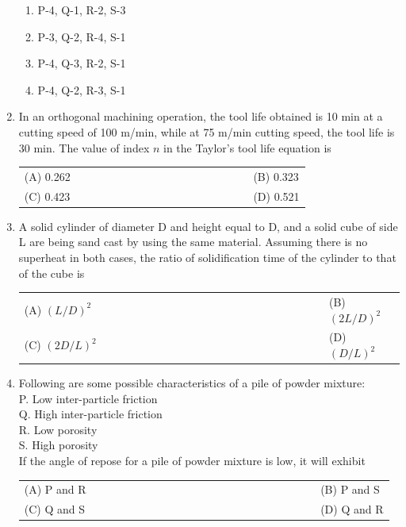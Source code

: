 \documentclass[a4paper,12pt]{article}
\begin{document}
\begin{enumerate}[label=Q.\arabic*, leftmargin=*]
\vspace{1em}

\begin{multicols}{2}
\begin{enumerate}[label=(\Alph*)]
    \item P-4, Q-1, R-2, S-3
    \item P-3, Q-2, R-4, S-1
    \item P-4, Q-3, R-2, S-1
    \item P-4, Q-2, R-3, S-1
\end{enumerate}
\end{multicols}

\item In an orthogonal machining operation, the tool life obtained is 10 min at a cutting speed of 100 m/min, while at 75 m/min cutting speed, the tool life is 30 min. The value of index $n$ in the Taylor's tool life equation is
\begin{multicols}{2}
\begin{tabular}[t]{p{0.8\linewidth} p{0.9\linewidth}}
(A) 0.262 & (B) 0.323 \\
(C) 0.423 & (D) 0.521 \\
\end{tabular}
\end{multicols}

\item A solid cylinder of diameter D and height equal to D, and a solid cube of side L are being sand cast by using the same material. Assuming there is no superheat in both cases, the ratio of solidification time of the cylinder to that of the cube is
\begin{multicols}{2}
\begin{tabular}[t]{p{0.8\linewidth} p{0.9\linewidth}}
(A) $(L/D)^2$& (B) $(2L/D)^2$ \\
(C) $(2D/L)^2$& (D) $(D/L)^2$ \\
\end{tabular}
\end{multicols}

\item Following are some possible characteristics of a pile of powder mixture: \\
P. Low inter-particle friction \\
Q. High inter-particle friction \\
R. Low porosity \\
S. High porosity \\
If the angle of repose for a pile of powder mixture is low, it will exhibit
\begin{multicols}{2}
\begin{tabular}[t]{p{0.8\linewidth} p{0.9\linewidth}}
(A) P and R & (B) P and S \\
(C) Q and S & (D) Q and R \\
\end{tabular}
\end{multicols}


\end{enumerate}
\end{document}
